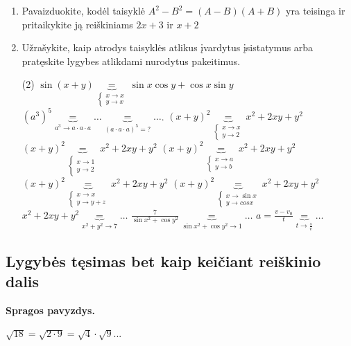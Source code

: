 \documentclass[a4paper]{article}
\begin{document}
\begin{enumerate}

\item Pavaizduokite, kodėl taisyklė $A^2-B^2=(A-B)(A+B)$ yra teisinga ir pritaikykite ją reiškiniams $2x+3$ ir $x+2$
\item Užrašykite, kaip atrodys taisyklės atlikus įvardytus įsistatymus arba pratęskite lygybes atlikdami nurodytus pakeitimus.
\begin{tasks}(2)
\task $\sin(x+y)\underbrace{=}_{\begin{cases} x \to x\\y \to x\end{cases}}\sin{x}\cos{y}+\cos{x}\sin{y}$
\task $(a^3)^5\underbrace{=}_{a^3\to a\cdot a\cdot a} \dots \underbrace{=}_{(a\cdot a\cdot a)^5= ?} \dots$.
\task $(x+y)^2\underbrace{=}_{\begin{cases} x \to x\\y \to 2\end{cases}}x^2+2xy+y^2$
\task $(x+y)^2\underbrace{=}_{\begin{cases} x \to 1\\y \to 2\end{cases}}x^2+2xy+y^2$
\task $(x+y)^2\underbrace{=}_{\begin{cases} x \to a\\y \to b\end{cases}}x^2+2xy+y^2$
\task $(x+y)^2\underbrace{=}_{\begin{cases} x \to x\\y \to y+z\end{cases}}x^2+2xy+y^2$
\task $(x+y)^2\underbrace{=}_{\begin{cases} x \to \sin x\\y \to cos x\end{cases}}x^2+2xy+y^2$
\task $x^2+2xy+y^2 \underbrace{=}_{x^2+y^2\to7} \dots$
\task $\frac{7}{\sin{x}^2+\cos{y}^2} \underbrace{=}_{\sin{x}^2+\cos{y}^2\to 1} \dots$
\task $a=\frac{v-v_0}{t} \underbrace{=}_{t\to \frac{s}{v}} \dots$
\end{tasks}
\end{enumerate}

\subsection*{Lygybės tęsimas bet kaip keičiant reiškinio dalis}

\textbf{Spragos pavyzdys.} 

$\sqrt{18}=\sqrt{2\cdot 9}=\sqrt{4}\cdot \sqrt{9}$...
\end{document}
